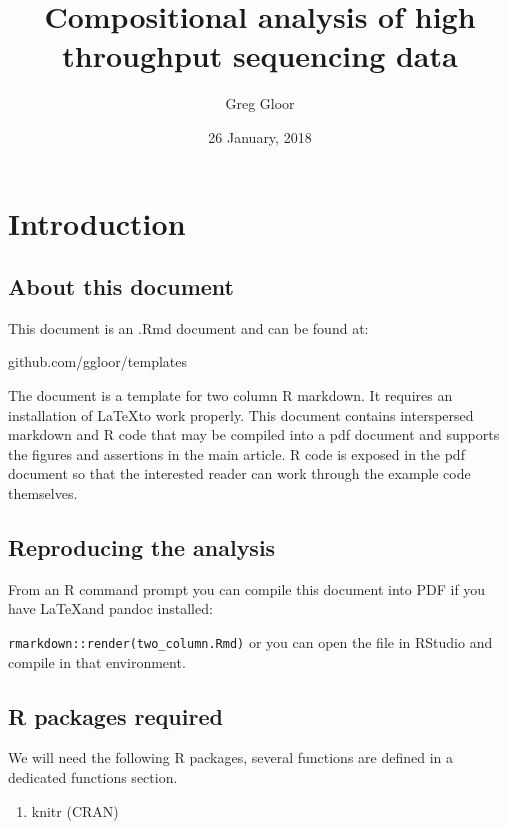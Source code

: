 \documentclass[twocolumn]{article}
\title{Compositional analysis of high throughput sequencing data}
\author{Greg Gloor}
\date{26 January, 2018}
\providecommand{\tightlist}{%
  \setlength{\itemsep}{0pt}\setlength{\parskip}{0pt}}
\begin{document}
\maketitle

{
\hypersetup{linkcolor=black}
\setcounter{tocdepth}{3}
\tableofcontents
}
\clearpage

\section{Introduction}\label{introduction}

\subsection{About this document}\label{about-this-document}

This document is an .Rmd document and can be found at:

github.com/ggloor/templates

The document is a template for two column R markdown. It requires an
installation of \LaTeX to work properly. This document contains
interspersed markdown and R code that may be compiled into a pdf
document and supports the figures and assertions in the main article. R
code is exposed in the pdf document so that the interested reader can
work through the example code themselves.

\subsection{Reproducing the analysis}\label{reproducing-the-analysis}

From an R command prompt you can compile this document into PDF if you
have \LaTeX and pandoc installed:

\texttt{rmarkdown::render(\textquotesingle{}two\_column.Rmd\textquotesingle{})}
or you can open the file in RStudio and compile in that environment.

\subsection{R packages required}\label{r-packages-required}

We will need the following R packages, several functions are defined in
a dedicated functions section.

\begin{enumerate}
\def\labelenumi{\arabic{enumi}.}
\tightlist
\item
  knitr (CRAN)
\end{enumerate}
\end{document}
